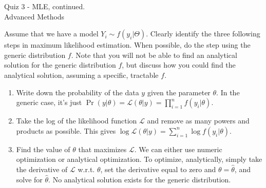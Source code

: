 \documentclass[10pt]{exam2}
\begin{document}
\begin{center}
{\LARGE Quiz 3 - MLE, continued}.\\\vspace{2mm}
\vspace{3mm}
{\large Advanced Methods}\\\vspace{2mm}
\end{center}

\begin{questions}

\question Assume that we have a model $Y_i \sim f(y_i | \Theta)$. Clearly identify the three following steps in maximum likelihood estimation. When possible, do the step using the generic distribution $f$. Note that you will not be able to find an analytical solution for the generic distribution $f$, but discuss how you could find the analytical solution, assuming a specific, tractable $f$.
\begin{solution}[3in]
\begin{enumerate}
\item Write down the probability of the data $y$ given the parameter $\theta$. In the generic case, it's just $\Pr(y | \theta) = \mathcal{L}(\theta | y) = \prod_{i =1}^n f(y_i |\theta)$.
\item Take the log of the likelihood function $\mathcal{L}$ and remove as many powers and products as possible. This gives $\log \mathcal{L} (\theta | y) = \sum_{i=1}^n \log f(y_i|\theta)$.
\item Find the value of $\theta$ that maximizes $\mathcal{L}$. We can either use numeric optimization or analytical optimization. To optimize, analytically, simply take the derivative of $\mathcal{L}$ w.r.t. $\theta$, set the derivative equal to zero and $\theta = \hat{\theta}$, and solve for $\hat{\theta}$. No analytical solution exists for the generic distribution.
\end{enumerate}
\end{solution}



\end{questions}
\end{document}
